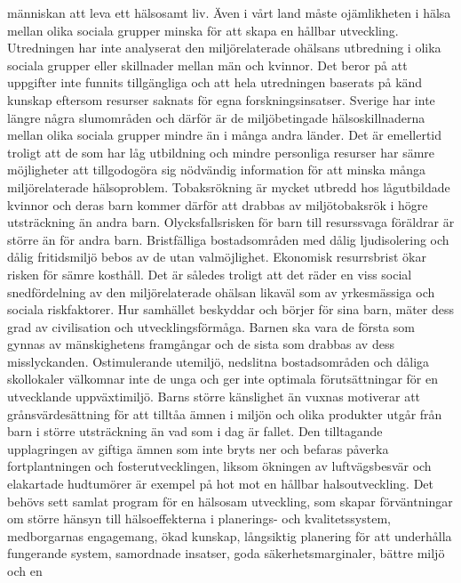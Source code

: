 människan att leva ett hälsosamt liv. Även i vårt land måste ojämlikheten i hälsa mellan olika sociala grupper minska för att skapa en hållbar utveckling.
Utredningen har inte analyserat den miljörelaterade ohälsans utbredning i olika sociala grupper eller skillnader mellan män och kvinnor. Det beror på att uppgifter inte funnits tillgängliga och att hela utredningen baserats på känd kunskap eftersom resurser saknats för egna forskningsinsatser. Sverige har inte längre några slumområden och därför är de miljöbetingade hälsoskillnaderna mellan olika sociala grupper mindre än i många andra länder. Det är emellertid troligt att de som har låg utbildning och mindre personliga resurser har sämre möjligheter att tillgodogöra sig nödvändig information för att minska många miljörelaterade hälsoproblem. Tobaksrökning är mycket utbredd hos lågutbildade kvinnor och deras barn kommer därför att drabbas av miljötobaksrök i högre utsträckning än andra barn. Olycksfallsrisken för barn till resurssvaga föräldrar är större än för andra barn. Bristfälliga bostadsområden med dålig ljudisolering och dålig fritidsmiljö bebos av de utan valmöjlighet. Ekonomisk resurrsbrist ökar risken för sämre kosthåll. Det är således troligt att det räder en viss social snedfördelning av den miljörelaterade ohälsan likaväl som av yrkesmässiga och sociala riskfaktorer.
Hur samhället beskyddar och börjer för sina barn, mäter dess grad av civilisation och utvecklingsförmåga. Barnen ska vara de första som gynnas av mänskighetens framgångar och de sista som drabbas av dess misslyckanden. Ostimulerande utemiljö, nedslitna bostadsområden och dåliga skollokaler välkomnar inte de unga och ger inte optimala förutsättningar för en utvecklande uppväxtimiljö. Barns större känslighet än vuxnas motiverar att grånsvärdesättning för att tilltåa ämnen i miljön och olika produkter utgår från barn i större utsträckning än vad som i dag är fallet.
Den tilltagande upplagringen av giftiga ämnen som inte bryts ner och befaras påverka fortplantningen och fosterutvecklingen, liksom ökningen av luftvägsbesvär och elakartade hudtumörer är exempel på hot mot en hållbar halsoutveckling. Det behövs sett samlat program för en hälsosam utveckling, som skapar förväntningar om större hänsyn till hälsoeffekterna i planerings- och kvalitetssystem, medborgarnas engagemang, ökad kunskap, långsiktig planering för att underhålla fungerande system, samordnade insatser, goda säkerhetsmarginaler, bättre miljö och en

